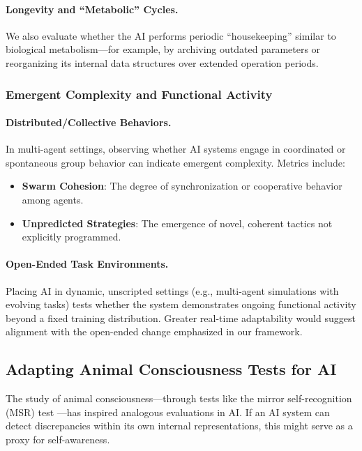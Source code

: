 \documentclass[12pt]{article}
\begin{document}
\paragraph{Longevity and ``Metabolic'' Cycles.}
We also evaluate whether the AI performs periodic ``housekeeping'' similar to
biological metabolism---for example, by archiving outdated parameters or reorganizing
its internal data structures over extended operation periods.

\subsubsection{Emergent Complexity and Functional Activity}
\paragraph{Distributed/Collective Behaviors.}
In multi-agent settings, observing whether AI systems engage in coordinated or
spontaneous group behavior can indicate emergent complexity. Metrics include:
\begin{itemize}
    \item \textbf{Swarm Cohesion}: The degree of synchronization or cooperative
          behavior among agents.
    \item \textbf{Unpredicted Strategies}: The emergence of novel, coherent tactics
          not explicitly programmed.
\end{itemize}

\paragraph{Open-Ended Task Environments.}
Placing AI in dynamic, unscripted settings (e.g., multi-agent simulations with evolving
tasks) tests whether the system demonstrates ongoing functional activity beyond a
fixed training distribution. Greater real-time adaptability would suggest alignment
with the open-ended change emphasized in our framework.

\subsection{Adapting Animal Consciousness Tests for AI}
\label{subsec:animal_tests_for_ai}

The study of animal consciousness---through tests like the mirror self-recognition (MSR)
test \cite{Gallup1970}---has inspired analogous evaluations in AI. If an AI system can
detect discrepancies within its own internal representations, this might serve as a
proxy for self-awareness.
\end{document}
